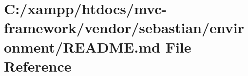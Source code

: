 \hypertarget{vendor_2sebastian_2environment_2_r_e_a_d_m_e_8md}{}\section{C\+:/xampp/htdocs/mvc-\/framework/vendor/sebastian/environment/\+R\+E\+A\+D\+ME.md File Reference}
\label{vendor_2sebastian_2environment_2_r_e_a_d_m_e_8md}
